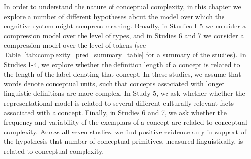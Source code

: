 In order to understand the nature of conceptual complexity, in this chapter we explore a number of different hypotheses about the model over which the cognitive system might compress meaning. Broadly, in Studies 1-5 we consider a compression model over the level of types, and in Studies 6 and 7 we consider a compression model over the level of tokens (see Table~\ref{tab:complexity_pred_summary_table} for a summary of the studies). In Studies 1-4, we explore whether the definition length of a concept  is related to the length of the label denoting that concept. In these studies, we assume that words denote conceptual units, such that concepts associated with longer linguistic definitions are  more complex. In Study 5, we ask whether whether the representational model is related to several different culturally relevant facts associated with a concept. Finally, in Studies 6 and 7, we ask whether the frequency and variability of the exemplars of a concept are related to conceptual complexity.  Across all seven studies, we find positive evidence only in support of the hypothesis that number of conceptual primitives, measured linguistically, is related to conceptual complexity.





 


